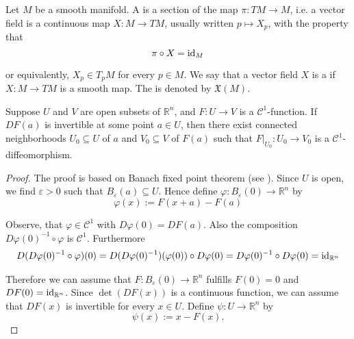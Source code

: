 \begin{definition}
	Let $M$ be a smooth manifold. A  is a section of the map $\pi: TM \to M$, i.e. a vector field is a continuous map $X : M \to TM$, usually written $p \mapsto X_p$, with the property that 
	\begin{equation}
		\pi \circ X = \operatorname{id}_M
	\end{equation}

	\noindent or equivalently, $X_p \in T_pM$ for every $p \in M$. We say that a vector field $X$ is a  if $X: M \to TM$ is a smooth map. The  is denoted by $\mathfrak{X}(M)$.
\end{definition}

\begin{proposition}
	
\end{proposition}

\begin{theorem}
	Suppose $U$ and $V$ are open subsets of $\mathbb{R}^n$, and $F: U \to V$ is a $\mathscr{C}^1$-function. If $DF(a)$ is invertible at some point $a \in U$, then there exist connected neighborhoods $U_0 \subseteq U$ of $a$ and $V_0 \subseteq V$ of $F(a)$ such that $F\vert_{U_0}: U_0 \to V_0$ is a $\mathscr{C}^1$-diffeomorphism.	
	\label{thm:inverse_fun_thm}
\end{theorem}

\begin{proof}
	The proof is based on Banach fixed point theorem (see \cite[657]{lee2013introduction}). Since $U$ is open, we find $\varepsilon > 0$ such that $B_\varepsilon(a) \subseteq U$. Hence define $\varphi: B_\varepsilon(0) \to \mathbb{R}^n$ by
	\begin{equation}
		\varphi(x) := F(x + a) - F(a)
	\end{equation}

	Observe, that $\varphi \in \mathscr{C}^1$ with $D\varphi(0) = DF(a)$. Also the composition $D\varphi(0)^{-1} \circ \varphi$ is $\mathscr{C}^1$. Furthermore
	\begin{align*}
		D(D\varphi(0)^{-1} \circ \varphi)(0) = D(D\varphi(0)^{-1})(\varphi(0)) \circ D\varphi(0) = D\varphi(0)^{-1} \circ D\varphi(0) = \operatorname{id}_{\mathbb{R}^n}
	\end{align*}

	Therefore we can assume that $F: B_\varepsilon(0) \to \mathbb{R}^n$ fulfills $F(0) = 0$ and $DF(0) = \operatorname{id}_{\mathbb{R}^n}$. Since $\det(DF(x))$ is a continuous function, we can assume that $DF(x)$ is invertible for every $x \in U$.
	Define $\psi: U \to \mathbb{R}^n$ by
	\begin{equation}
		\psi(x) := x - F(x).
	\end{equation}
\end{proof}

